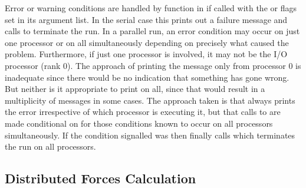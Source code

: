 \documentclass[a4paper,twoside]{report}
\begin{document}
Error or warning conditions are handled by function 
in  if called with the  or 
flags set in its argument list.  In the serial case this prints out a
failure message and calls  to terminate the run.  In a
parallel run, an error condition may occur on just one processor or on
all simultaneously depending on precisely what caused the problem.
Furthermore, if just one processor is involved, it may not be the I/O
processor (rank 0).  The approach of printing the message only from
processor 0 is inadequate since there would be no indication that
something has gone wrong.  But neither is it appropriate to print on
all, since that would result in a multiplicity of messages in some
cases.  The approach taken is that  always prints
the error irrespective of which processor is executing it, but that
calls to  are made conditional on
 for those conditions known to occur on all
processors simultaneously. If the condition signalled was
 then  finally calls 
which terminates the run on all processors.

\subsection{Distributed Forces Calculation}
\end{document}
